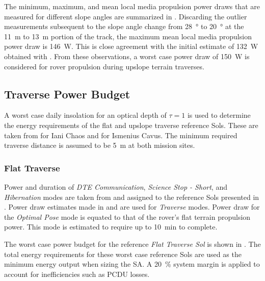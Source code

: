 The minimum, maximum, and mean local media propulsion power draws that are measured for different slope angles are summarized in . Discarding the outlier measurements subsequent to the slope angle change from \SI{28}{\degree} to \SI{20}{\degree} at the \SI{11}{\meter} to \SI{13}{\meter} portion of the track, the maximum mean local media propulsion power draw is \SI{146}{\watt}. This is close agreement with the initial estimate of \SI{132}{\watt} obtained with . From these observations, a worst case power draw of \SI{150}{\watt} is considered for rover propulsion during upslope terrain traverses.



\subsection{Traverse Power Budget}
\label{sec:PowerBudget:PowerBudget:TraversePowerBudget}
A worst case daily insolation for an optical depth of $\tau = 1$ is used to determine the energy requirements of the flat and upslope traverse reference Sols. These are taken from  for Iani Chaos and  for Ismenius Cavus. The minimum required traverse distance is assumed to be \SI{5}{\meter} at both mission sites.

\subsubsection{Flat Traverse}
\label{sec:Design:PowerBudget:TraversePowerBudget:FlatTraverse}

Power and duration of \textit{\ac{DTE} Communication}, \textit{Science Stop - Short}, and \textit{Hibernation} modes are taken from  and assigned to the reference Sols presented in . Power draw estimates made in  and  are used for \textit{Traverse} modes. Power draw for the \textit{Optimal Pose} mode is equated to that of the rover's flat terrain propulsion power. This mode is estimated to require up to \SI{10}{\minute} to complete.

The worst case power budget for the reference \textit{Flat Traverse Sol} is shown in . The total energy requirements for these worst case reference Sols are used as the minimum energy output when sizing the \ac{SA}. A \SI{20}{\percent} system margin is applied to account for inefficiencies such as \ac{PCDU} losses.

